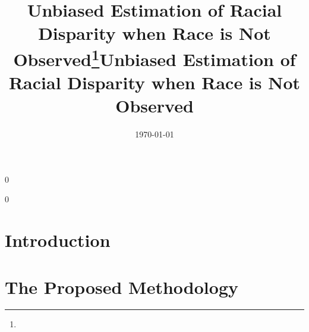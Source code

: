 \documentclass[11pt]{article}
\theoremstyle{plain}
\newcommand\spacingset[1]{\renewcommand{\baselinestretch}%
  {#1}\small\normalsize}
\newcommand{\blind}{0}
\begin{document}
\newcommand{\tit}{Unbiased Estimation of Racial Disparity when Race is
Not Observed}
%

\spacingset{1.25}

\blind

{\title{{\bf\tit}\thanks{}}

  \author{}


  \date{\today
}

\maketitle

}\fi


\blind
\title{\bf \tit}


\maketitle
\fi


\thispagestyle{empty}
\setcounter{page}{0}

\begin{abstract}


 \medskip

\end{abstract}



\clearpage
\spacingset{1.5}

\section{Introduction}

\section{The Proposed Methodology}
\end{document}
